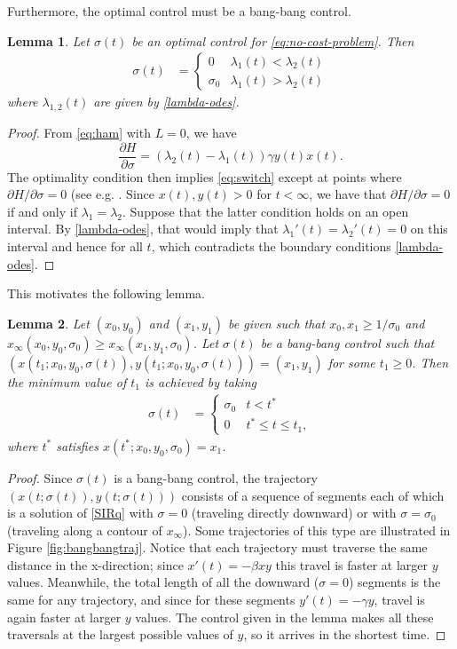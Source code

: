 \documentclass[english,12pt,letter]{article}
\newtheorem{lem}{Lemma}
\newcommand{\Rnot}{\sigma_0}
\newcommand{\Sinf}{x_\infty}
\begin{document}
Furthermore, the optimal control must be a bang-bang control.
\begin{lem} \label{lem:bang-bang}
Let $\sigma(t)$ be an optimal control for \eqref{eq:no-cost-problem}.
Then
\begin{align} \label{eq:switch}
    \sigma(t) & = \begin{cases} 0 & \lambda_1(t)<\lambda_2(t) \\ \sigma_0 & \lambda_1(t) > \lambda_2(t) \end{cases}
\end{align}
where $\lambda_{1,2}(t)$ are given by \eqref{lambda-odes}.
\end{lem}
\begin{proof}
From \eqref{eq:ham} with $L=0$, we have
$$
\frac{\partial H}{\partial \sigma} = (\lambda_2(t)-\lambda_1(t))\gamma y(t) x(t).
$$
The optimality condition then implies \eqref{eq:switch} except at points where $\partial H/\partial \sigma=0$
(see e.g. \cite[Ch. 17]{lenhart2007optimal}.
Since $x(t),y(t) >0$ for $t<\infty$, we have that $\partial H/\partial \sigma=0$
if and only if $\lambda_1=\lambda_2$.  Suppose that the latter condition holds on
an open interval.  By \eqref{lambda-odes}, that would imply that $\lambda_1'(t) = \lambda_2'(t)=0$ on this
interval and hence for all $t$, which contradicts the boundary conditions \eqref{lambda-odes}.
\end{proof}

This motivates the following lemma.

\begin{lem} \label{lem:shortest-path}
Let $(x_0,y_0)$ and $(x_1,y_1)$ be given such that $x_0, x_1 \ge 1/\Rnot$ and
$\Sinf(x_0,y_0,\Rnot)\ge\Sinf(x_1,y_1,\Rnot)$.
Let $\sigma(t)$ be a bang-bang control such that $(x(t_1;x_0,y_0,\sigma(t)),y(t_1;x_0,y_0,\sigma(t)))=(x_1,y_1)$
for some $t_1\ge0$.  Then the minimum value of $t_1$ is achieved by taking
\begin{align} \label{eq:one-switch}
    \sigma(t) & = \begin{cases}
        \Rnot & t<t^* \\
        0 & t^* \le  t \le t_1,
    \end{cases}
\end{align}
where $t^*$ satisfies $x(t^*;x_0,y_0,\Rnot)=x_1$.
\end{lem}
\begin{proof}
Since $\sigma(t)$ is a bang-bang control, the trajectory $(x(t;\sigma(t)),y(t;\sigma(t)))$ 
consists of a sequence of segments each of which is a solution of
\eqref{SIRq} with $\sigma=0$ (traveling directly downward) or with $\sigma=\sigma_0$
(traveling along a contour of $x_\infty$).  Some trajectories of this type are
illustrated in Figure \ref{fig:bangbangtraj}.  Notice that each trajectory must
traverse the same distance in the x-direction; since $x'(t)=-\beta xy$ this
travel is faster at larger $y$ values.  Meanwhile, the total length of all the
downward ($\sigma=0$) segments is the same for any trajectory, and since for
these segments $y'(t) = -\gamma y$, travel is again faster at larger $y$ values.
The control given in the lemma makes all these traversals at the largest
possible values of $y$, so it arrives in the shortest time.
\end{proof}
\end{document}
